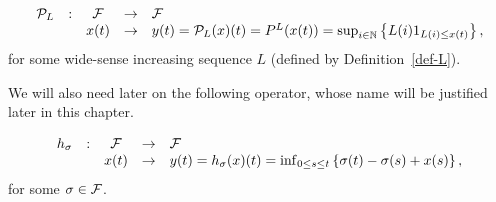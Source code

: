 
\begin{definition}
$$ \begin{array}{ccccl}
\mathcal P_L & : & \mathcal F & \rightarrow & \mathcal F \\
        & & x(t) & \rightarrow & y(t) = \mathcal P_L (x)(t) = P^L(x(t)) =
\sup_{i \in \mathbb{N}} \left\{ L(i) 1_{L(i) \leq  x(t)} \right\},
\end{array} $$
for some wide-sense increasing sequence $L$ (defined by Definition~\ref{def-L}).
\end{definition}


We will also need later on the following operator, whose name will be justified later in this chapter.

\begin{definition}
$$ \begin{array}{ccccl}
h_\sigma & : & \mathcal F & \rightarrow & \mathcal F \\
        & & x(t) & \rightarrow & y(t) = h_\sigma (x)(t) = \inf_{0 \leq s \leq t} \left\{ \sigma(t) - \sigma(s) + x(s) \right\},
\end{array}$$
for some $\sigma \in \mathcal F$.
\end{definition}



